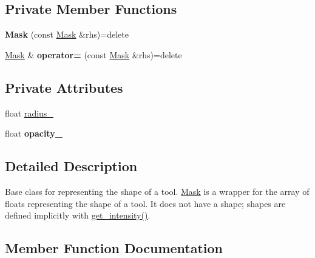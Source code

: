 \subsection*{Private Member Functions}
\begin{DoxyCompactItemize}
\item 
{\bfseries Mask} (const \hyperlink{classimage__tools_1_1Mask}{Mask} \&rhs)=delete\hypertarget{classimage__tools_1_1Mask_ae42a9089c82cdf624560a0201e3fa138}{}\label{classimage__tools_1_1Mask_ae42a9089c82cdf624560a0201e3fa138}

\item 
\hyperlink{classimage__tools_1_1Mask}{Mask} \& {\bfseries operator=} (const \hyperlink{classimage__tools_1_1Mask}{Mask} \&rhs)=delete\hypertarget{classimage__tools_1_1Mask_a4d312e1eeee6d449df299e1413cd7e4e}{}\label{classimage__tools_1_1Mask_a4d312e1eeee6d449df299e1413cd7e4e}

\end{DoxyCompactItemize}
\subsection*{Private Attributes}
\begin{DoxyCompactItemize}
\item 
float \hyperlink{classimage__tools_1_1Mask_a6cbfdf0dac5401d3c296f1a33c92ec46}{radius\+\_\+}
\item 
float {\bfseries opacity\+\_\+}\hypertarget{classimage__tools_1_1Mask_aceb1552d63b5ccd76e4096b2a36ffd99}{}\label{classimage__tools_1_1Mask_aceb1552d63b5ccd76e4096b2a36ffd99}

\end{DoxyCompactItemize}


\subsection{Detailed Description}
Base class for representing the shape of a tool. \hyperlink{classimage__tools_1_1Mask}{Mask} is a wrapper for the array of floats representing the shape of a tool. It does not have a shape; shapes are defined implicitly with \hyperlink{classimage__tools_1_1Mask_a72f63a05779159c4f5e2bfea21160c8a}{get\+\_\+intensity()}. 

\subsection{Member Function Documentation}
